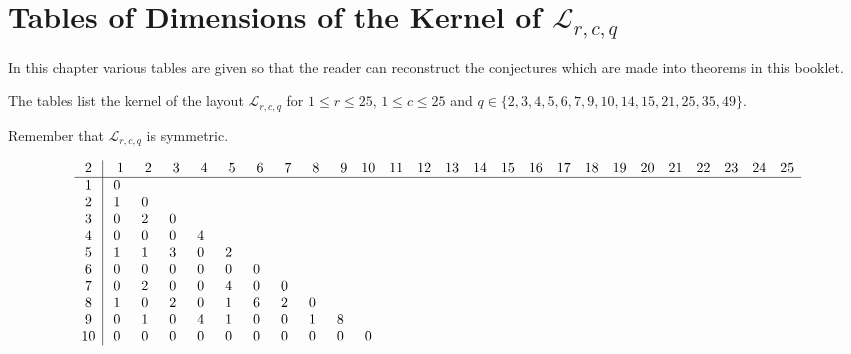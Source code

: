 \chapter{Tables of Dimensions of the Kernel of $\mathcal{L}_{r,c,q}$}

In this chapter various tables are given so that the reader can reconstruct the
conjectures which are made into theorems in this booklet.

The tables list the kernel of the layout $\mathcal{L}_{r,c,q}$ for $1\le r\le
25$, $1\le c \le 25$ and $q\in\{2,3,4,5,6,7,9,10,14,15,21,25,35,49\}$.

Remember that $\mathcal{L}_{r,c,q}$ is symmetric.

\begin{landscape}
\tiny
\[
\begin{array}{c|ccccccccccccccccccccccccc}\addcontentsline{lot}{table}{\protect\numberline{}Dimensions of the Kernel of $\mathcal{L}_{r,c,2}$}
 2&  \phantom{0}1&  \phantom{0}2&  \phantom{0}3&  \phantom{0}4&  \phantom{0}5&  \phantom{0}6&  \phantom{0}7&  \phantom{0}8&  \phantom{0}9& 10& 11& 12& 13& 14& 15& 16& 17& 18& 19& 20& 21& 22& 23& 24& 25\\
\hline
 1&  0&   &   &   &   &   &   &   &   &   &   &   &   &   &   &   &   &   &   &   &   &   &   &   &   \\
 2&  1&  0&   &   &   &   &   &   &   &   &   &   &   &   &   &   &   &   &   &   &   &   &   &   &   \\
 3&  0&  2&  0&   &   &   &   &   &   &   &   &   &   &   &   &   &   &   &   &   &   &   &   &   &   \\
 4&  0&  0&  0&  4&   &   &   &   &   &   &   &   &   &   &   &   &   &   &   &   &   &   &   &   &   \\
 5&  1&  1&  3&  0&  2&   &   &   &   &   &   &   &   &   &   &   &   &   &   &   &   &   &   &   &   \\
 6&  0&  0&  0&  0&  0&  0&   &   &   &   &   &   &   &   &   &   &   &   &   &   &   &   &   &   &   \\
 7&  0&  2&  0&  0&  4&  0&  0&   &   &   &   &   &   &   &   &   &   &   &   &   &   &   &   &   &   \\
 8&  1&  0&  2&  0&  1&  6&  2&  0&   &   &   &   &   &   &   &   &   &   &   &   &   &   &   &   &   \\
 9&  0&  1&  0&  4&  1&  0&  0&  1&  8&   &   &   &   &   &   &   &   &   &   &   &   &   &   &   &   \\
10&  0&  0&  0&  0&  0&  0&  0&  0&  0&  0&   &   &   &   &   &   &   &   &   &   &   &   &   &   &   \\

\end{array}\]
\end{landscape}
